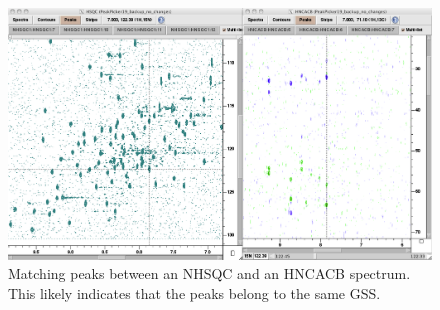 \begin{figure}
  \includegraphics[scale=0.3]{figures/nhsqc_hncacb}
  \caption[Matching peaks between an NHSQC and an HNCACB spectrum]
          {Matching peaks between an NHSQC and an HNCACB spectrum.
           This likely indicates that the peaks belong to the same GSS.}
  \label{nhsqc_hncacb}
\end{figure}

